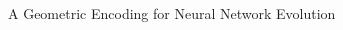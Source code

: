\begin{frame}{\tciii{} A Geometric Encoding for Neural Network Evolution}
\begin{columns}
    \begin{column}{0.45\linewidth}
    \begin{center}
    \end{center}
    \end{column}
    \end{columns}
    
    \begin{columns}
    \begin{column}{0.45\linewidth}
    \begin{center}
    \end{center}
    \end{column}
    
    \begin{column}{0.45\linewidth}
    \begin{center}
    
    \end{center}
    \end{column}
    \end{columns}
    
\end{frame}


